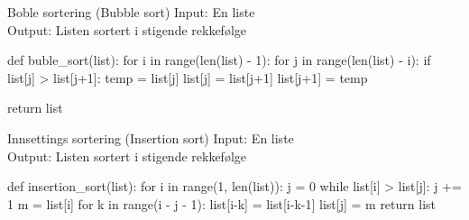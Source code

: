 \begin{frame}[fragile]{Boble sortering (Bubble sort)}
    Input: En liste \\
    Output: Listen sortert i stigende rekkefølge \\

    \begin{python}
def buble_sort(list):
    for i in range(len(list) - 1):
        for j in range(len(list) - i):
            if list[j] > list[j+1]:
                temp = list[j]
                list[j] = list[j+1]
                list[j+1] = temp
    
    return list
    \end{python}
\end{frame}

\begin{frame}[fragile]{Innsettings sortering (Insertion sort)}
    Input: En liste \\
    Output: Listen sortert i stigende rekkefølge \\

    \begin{python}
def insertion_sort(list):
    for i in range(1, len(list)):
        j = 0
        while list[i] > list[j]:
            j += 1
        m = list[i]
        for k in range(i - j - 1):
            list[i-k] = list[i-k-1]
        list[j] = m
    return list
    \end{python}
\end{frame}